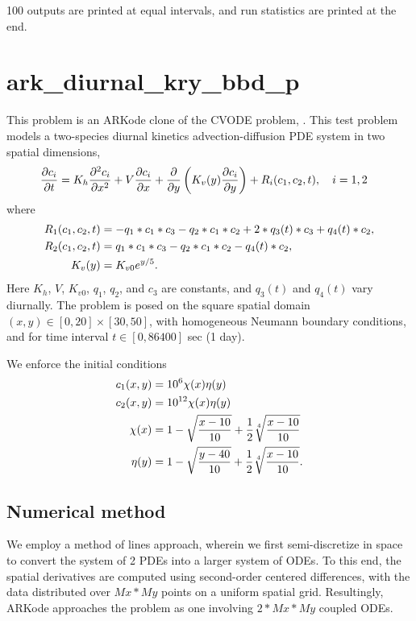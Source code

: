 \documentclass[letterpaper,10pt,english]{sphinxmanual}
\begin{document}
100 outputs are printed at equal intervals, and run statistics
are printed at the end.


\chapter{ark\_diurnal\_kry\_bbd\_p}
\label{ark_diurnal_kry_bbd_p:ark-diurnal-kry-bbd-p}\label{ark_diurnal_kry_bbd_p::doc}\label{ark_diurnal_kry_bbd_p:id1}
This problem is an ARKode clone of the CVODE problem,
.  This test problem models a two-species
diurnal kinetics advection-diffusion PDE system in two spatial
dimensions,
\begin{gather}
\begin{split}\frac{\partial c_i}{\partial t} &=
  K_h \frac{\partial^2 c_i}{\partial x^2} +
  V \frac{\partial     c_i}{\partial x} +
  \frac{\partial}{\partial y}\left( K_v(y)
  \frac{\partial c_i}{\partial y}\right) +
  R_i(c_1,c_2,t),\quad i=1,2\end{split}\notag
\end{gather}
where
\begin{gather}
\begin{split}R_1(c_1,c_2,t) &= -q_1*c_1*c_3 - q_2*c_1*c_2 + 2*q_3(t)*c_3 + q_4(t)*c_2, \\
R_2(c_1,c_2,t) &=  q_1*c_1*c_3 - q_2*c_1*c_2 - q_4(t)*c_2, \\
K_v(y) &= K_{v0} e^{y/5}.\end{split}\notag
\end{gather}
Here $K_h$, $V$, $K_{v0}$, $q_1$, $q_2$,
and $c_3$ are constants, and $q_3(t)$ and $q_4(t)$
vary diurnally.  The problem is posed on the square spatial domain
$(x,y) \in [0,20]\times[30,50]$, with homogeneous Neumann
boundary conditions, and for time interval $t\in [0,86400]$ sec
(1 day).

We enforce the initial conditions
\begin{gather}
\begin{split}c_1(x,y) &=  10^6 \chi(x)\eta(y) \\
c_2(x,y) &=  10^{12} \chi(x)\eta(y) \\
\chi(x) &= 1 - \sqrt{\frac{x - 10}{10}} + \frac12 \sqrt[4]{\frac{x - 10}{10}} \\
\eta(y) &= 1 - \sqrt{\frac{y - 40}{10}} + \frac12 \sqrt[4]{\frac{x - 10}{10}}.\end{split}\notag
\end{gather}

\section{Numerical method}
\label{ark_diurnal_kry_bbd_p:numerical-method}
We employ a method of lines approach, wherein we first
semi-discretize in space to convert the system of 2 PDEs into a larger
system of ODEs.  To this end, the spatial derivatives are computed
using second-order centered differences, with the data distributed
over $Mx*My$ points on a uniform spatial grid.  Resultingly, ARKode
approaches the problem as one involving $2*Mx*My$ coupled ODEs.
\end{document}

